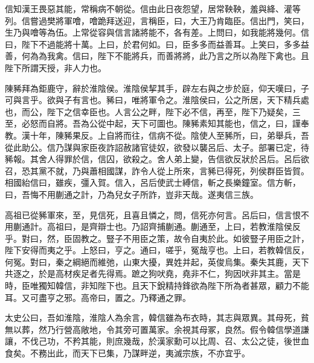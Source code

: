 信知漢王畏惡其能，常稱病不朝從。信由此日夜怨望，居常鞅鞅，羞與絳、灌等列。信嘗過樊將軍噲，噲跪拜送迎，言稱臣，曰，大王乃肯臨臣。信出門，笑曰，生乃與噲等為伍。上常從容與信言諸將能不，各有差。上問曰，如我能將幾何。信曰，陛下不過能將十萬。上曰，於君何如。曰，臣多多而益善耳。上笑曰，多多益善，何為為我禽。信曰，陛下不能將兵，而善將將，此乃言之所以為陛下禽也。且陛下所謂天授，非人力也。

陳豨拜為鉅鹿守，辭於淮陰侯。淮陰侯挈其手，辟左右與之步於庭，仰天嘆曰，子可與言乎。欲與子有言也。豨曰，唯將軍令之。淮陰侯曰，公之所居，天下精兵處也，而公，陛下之信幸臣也。人言公之畔，陛下必不信，再至，陛下乃疑矣，三至，必怒而自將。吾為公從中起，天下可圖也。陳豨素知其能也，信之，曰，謹奉教。漢十年，陳豨果反。上自將而往，信病不從。陰使人至豨所，曰，弟舉兵，吾從此助公。信乃謀與家臣夜詐詔赦諸官徒奴，欲發以襲呂后、太子。部署已定，待豨報。其舍人得罪於信，信囚，欲殺之。舍人弟上變，告信欲反狀於呂后。呂后欲召，恐其黨不就，乃與蕭相國謀，詐令人從上所來，言豨已得死，列侯群臣皆賀。相國紿信曰，雖疾，彊入賀。信入，呂后使武士縛信，斬之長樂鐘室。信方斬，曰，吾悔不用蒯通之計，乃為兒女子所詐，豈非天哉。遂夷信三族。

高祖已從豨軍來，至，見信死，且喜且憐之，問，信死亦何言。呂后曰，信言恨不用蒯通計。高祖曰，是齊辯士也。乃詔齊捕蒯通。蒯通至，上曰，若教淮陰侯反乎。對曰，然，臣固教之。豎子不用臣之策，故令自夷於此。如彼豎子用臣之計，陛下安得而夷之乎。上怒曰，亨之。通曰，嗟乎，冤哉亨也。上曰，若教韓信反，何冤。對曰，秦之綱絕而維弛，山東大擾，異姓并起，英俊烏集。秦失其鹿，天下共逐之，於是高材疾足者先得焉。蹠之狗吠堯，堯非不仁，狗因吠非其主。當是時，臣唯獨知韓信，非知陛下也。且天下銳精持鋒欲為陛下所為者甚眾，顧力不能耳。又可盡亨之邪。高帝曰，置之。乃釋通之罪。

太史公曰，吾如淮陰，淮陰人為余言，韓信雖為布衣時，其志與眾異。其母死，貧無以葬，然乃行營高敞地，令其旁可置萬家。余視其母冢，良然。假令韓信學道謙讓，不伐己功，不矜其能，則庶幾哉，於漢家勳可以比周、召、太公之徒，後世血食矣。不務出此，而天下已集，乃謀畔逆，夷滅宗族，不亦宜乎。
